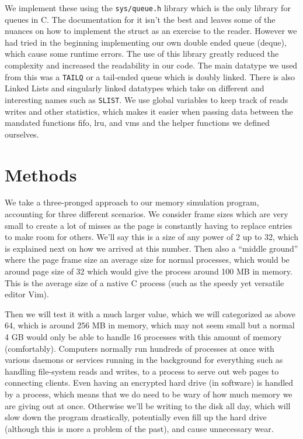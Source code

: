 \documentclass[12pt,letterpaper]{article}
\begin{document}
	We implement these using the \texttt{sys/queue.h} library which is the only library for queues in C. The documentation for it isn't the best and leaves some of the nuances on how to implement the struct as an exercise to the reader. However we had tried in the beginning implementing our own double ended queue (deque), which cause some runtime errors. The use of this library greatly reduced the complexity and increased the readability in our code. The main datatype we used from this was a \texttt{TAILQ} or a tail-ended queue which is doubly linked. There is also Linked Lists and singularly linked datatypes which take on different and interesting names such as \texttt{SLIST}. We use global variables to keep track of reads writes and other statistics, which makes it easier when passing data between the mandated functions fifo, lru, and vms and the helper functions we defined ourselves.
	
	\section{Methods}
	We take a three-pronged approach to our memory simulation program, accounting for three different scenarios. We consider frame sizes which are very small to create a lot of misses as the page is constantly having to replace entries to make room for others. We'll say this is a size of any power of 2 up to 32, which is explained next on how we arrived at this number. Then also a ``middle ground'' where the page frame size an average size for normal processes, which would be around page size of 32 which would give the process around 100 MB in memory. This is the average size of a native C process (such as the speedy yet versatile editor Vim).
	
	Then we will test it with a much larger value, which we will categorized as above 64, which is around 256 MB in memory, which may not seem small but a normal 4 GB would only be able to handle 16 processes with this amount of memory (comfortably). Computers normally run hundreds of processes at once with various daemons or services running in the background for everything such as handling file-system reads and writes, to a process to serve out web pages to connecting clients. Even having an encrypted hard drive (in software) is handled by a process, which means that we do need to be wary of how much memory we are giving out at once. Otherwise we'll be writing to the disk all day, which will slow down the program drastically, potentially even fill up the hard drive (although this is more a problem of the past), and cause unnecessary wear.
	
\end{document}
